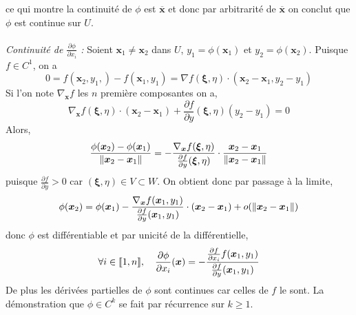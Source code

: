 {\[\]
ce qui montre la continuité de $\phi$ est $\bm{\overline x}$ et donc par arbitrarité de $\bm{\overline x}$ on conclut que $\phi$ est continue sur $U$. \\\\
\textit{Continuité de $\frac{\partial \phi}{\partial x_i}$ : } Soient $\bm x_1 \neq \bm x_2$ dans $U$, $y_1 = \phi(\bm x_1)$ et	$y_2 = \phi(\bm x_2)$. Puisque $f \in C^1$, on a 
\[
0 = f(\bm x_2, y_1,) - f(\bm x_1, y_1) = \nabla f(\bm \xi, \eta) \cdot (\bm x_2 - \bm x_1, y_2 - y_1)
\]
Si l'on note $\nabla_{\bm x} f$ les $n$ première composantes on a,
\[
\nabla_{\bm x} f(\bm \xi, \eta) \cdot (\bm x_2 - \bm x_1) + \frac{\partial f}{\partial y} (\bm \xi, \eta)(y_2 - y_1) = 0
\]
Alors,
\[
\frac{\phi(\bm x_2) - \phi(\bm x_1)}{\left\| \bm x_2 - \bm x_1 \right\|} = - \frac{\nabla_{\bm x} f(\bm \xi, \eta)}{\frac{\partial f}{\partial y} (\bm \xi, \eta)} \cdot \frac{\bm x_2 - \bm x_1}{\left\| \bm x_2 - \bm x_1 \right\|}
\]
puisque $\frac{\partial f}{\partial y} > 0$ car $(\bm \xi, \eta) \in V \subset W$. On obtient donc par passage à la limite,
\[
\phi(\bm x_2) = \phi(\bm x_1) - \frac{\nabla_{\bm x} f(\bm x_1, y_1)}{\frac{\partial f}{\partial y}(\bm x_1, y_1)} \cdot (\bm x_2 - \bm x_1) + o(\left\| \bm x_2 - \bm x_1 \right\|)
\]
donc $\phi$ est différentiable et par unicité de la différentielle,
\[
\forall i \in \llbracket 1, n \rrbracket, \quad \frac{\partial \phi}{\partial x_i}(\bm x) = -\frac{\frac{\partial f}{\partial x_i} f(\bm x_1, y_1)}{\frac{\partial f}{\partial y}(\bm x_1, y_1)} 
\]
De plus les dérivées partielles de $\phi$ sont continues car celles de $f$ le sont. La démonstration que $\phi \in C^k$ se fait par récurrence sur $k \geqslant 1$.
}


